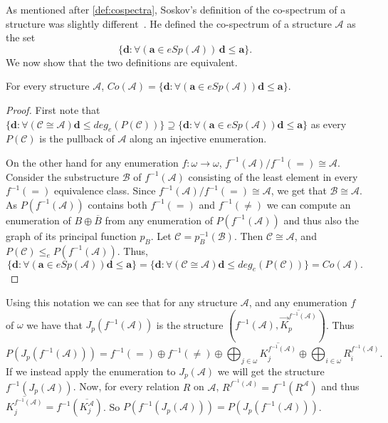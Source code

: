 \documentclass[11pt]{amsart}
\newcommand{\A}{{\mathcal{A}}}
\newcommand{\B}{{\mathcal{B}}}
\begin{document}
As mentioned after \cref{def:cospectra}, Soskov's definition of the co-spectrum of a structure was slightly different~\cite{soskov2004}. He defined the co-spectrum of a structure $\A$ as the set
\[\{\mathbf d: \forall (\mathbf a\in eSp(\A))\, \mathbf d\leq \mathbf a\}. \]
We now show that the two definitions are equivalent.
\begin{proposition}
    For every structure $\A$, $Co(\A)=\{\mathbf d: \forall (\mathbf a\in eSp(\A)) \mathbf d\leq \mathbf a\}$.
\end{proposition}
\begin{proof}
  First note that $\{\mathbf d: \forall (\mathcal C\cong\A) \mathbf d\leq deg_e(P(\mathcal C))\}\supseteq \{\mathbf d: \forall (\mathbf a\in eSp(\A)) \mathbf d\leq \mathbf a\}$ as every $P(\mathcal C)$ is the pullback of $\A$ along an injective enumeration.
  
  On the other hand for any enumeration $f:\omega\to\omega$, $f^{-1}(\A)/f^{-1}(=)\cong\A$. Consider the substructure $\B$ of $f^{-1}(\A)$ consisting of the least element in every $f^{-1}(=)$ equivalence class. Since $f^{-1}(\A)/f^{-1}(=)\cong\A$, we get that $\B\cong \A$. As $P(f^{-1}(\A))$ contains both $f^{-1}(=)$ and $f^{-1}(\neq)$ we can compute an enumeration of $B\oplus \overline B$ from any enumeration of $P(f^{-1}(\A))$ and thus also the graph of its principal function $p_B$. Let $\mathcal C=p_B^{-1}(\B)$. Then $\mathcal C \cong \A$, and $P(\mathcal C)\leq_e P(f^{-1}(\A))$. %
  Thus, 
  \[\{\mathbf d: \forall (\mathbf a\in eSp(\A)) \mathbf d\leq \mathbf a\}=\{\mathbf d: \forall (\mathcal C\cong \A) \mathbf d\leq deg_e(P(\mathcal C))\}=Co(\A).\]
\end{proof}

Using this notation we can see that for any structure $\A$, and any enumeration $f$ of $\omega$ we have that $J_p(f^{-1}(\A))$ is the structure $(f^{-1}(\A),\overline{ \vec K_p^{f^{-1}(\A)}})$. Thus
\begin{equation*}
    P(J_p(f^{-1}(\A))) = f^{-1}(=) \oplus f^{-1}(\neq)\oplus \bigoplus_{j \in \omega}  \overline{K_j^{f^{-1}(\A)}} \oplus\bigoplus_{i \in \omega} R^{f^{-1}(\A)}_i.
\end{equation*}
If we instead apply the enumeration to $J_p(\A)$ we will get the structure $f^{-1}(J_p(\A))$. Now, for every relation $R$ on $\A$, $R^{f^{-1}(\A)} = f^{-1}(R^\A)$ and thus $\overline{ K_j^{f^{-1}(\A)}} = f^{-1}\left(\overline{ K_j^{\A}}\right)$. So $P(f^{-1}(J_p(\A))) = P(J_p(f^{-1}(\A)))$.
\end{document}
